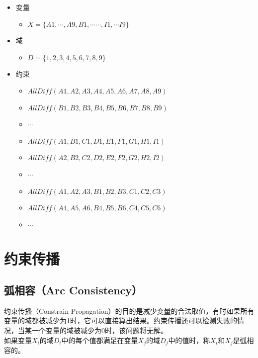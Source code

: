 \begin{itemize}
    \item 变量
          \begin{itemize}
              \item $ X = \{A1, \cdots, A9, B1, \cdots \cdots, I1, \cdots I9\} $
          \end{itemize}
    \item 域
          \begin{itemize}
              \item $ D = \{1, 2, 3, 4, 5, 6, 7, 8, 9\} $
          \end{itemize}
    \item 约束
          \begin{itemize}
              \item $ AllDiff(A1, A2, A3, A4, A5, A6, A7, A8, A9) $
              \item $ AllDiff(B1, B2, B3, B4, B5, B6, B7, B8, B9) $
              \item $ \cdots $
              \item $ AllDiff(A1, B1, C1, D1, E1, F1, G1, H1, I1) $
              \item $ AllDiff(A2, B2, C2, D2, E2, F2, G2, H2, I2) $
              \item $ \cdots $
              \item $ AllDiff(A1, A2, A3, B1, B2, B3, C1, C2, C3) $
              \item $ AllDiff(A4, A5, A6, B4, B5, B6, C4, C5, C6) $
              \item $ \cdots $
          \end{itemize}
\end{itemize}

\newpage

\section{约束传播}

\subsection{弧相容（Arc Consistency）}

约束传播（Constrain Propagation）的目的是减少变量的合法取值，有时如果所有变量的域都被减少为1时，它可以直接算出结果。约束传播还可以检测失败的情况，当某一个变量的域被减少为0时，该问题将无解。\\

如果变量$ X_i $的域$ D_i $中的每个值都满足在变量$ X_j $的域$ D_j $中的值时，称$ X_i $和$ X_j $是弧相容的。\\

